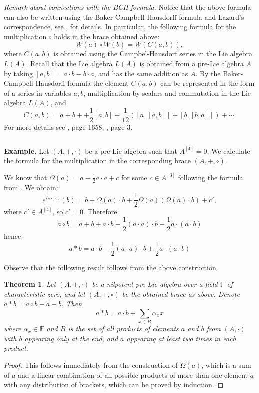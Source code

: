 \documentclass[12pt]{article}
\newtheorem{theorem}{Theorem}
\begin{document}
$ $

{\em Remark about connections with the BCH formula. } Notice that the above formula can also be written using the Baker-Campbell-Hausdorff formula and  Lazard's correspondence, see \cite{AG}, \cite{M} for details.
  In particular, the following formula for the multiplication $\circ $ holds in the brace obtained above:
\[ W(a)\circ W(b)= W(C(a, b)),\]
 where $C(a, b)$ is obtained using the Campbel-Hausdorf series in the Lie algebra $L(A)$.  Recall that the Lie algebra $L(A)$ is obtained from a pre-Lie algebra $A$ by taking $[a,b]=a\cdot b-b\cdot a$, and has the same addition as  $A$.
 By the Baker-Campbell-Hausdorff formula the element $C(a, b)$ can be represented in the form of a series in variables $a, b$, multiplication by scalars and commutation in the Lie algebra $L(A)$, and 
\[C(a,b)=a+b++{\frac 12}[a,b]+{\frac 1{12}}([a,[a,b]]+[b,[b,a]])+\cdots .\] 
 For more details see \cite {AG}, page 1658, \cite{M}, page 3.

$ $

{\bf Example.} Let $(A, +, \cdot )$ be a pre-Lie algebra such that $A^{[4]}=0$.
 We calculate the formula for the multiplication in the corresponding brace $(A, +, \circ )$.

We know that  $\Omega (a)=  a-{\frac 12}a\cdot a  +c$ for some $ c\in A^{[3]}$  following the formula from \cite{M}.
 We obtain:
\[e^{L_{\Omega (a)}}(b)=b+\Omega (a)\cdot b+{\frac 12}\Omega (a)(\Omega (a)\cdot b)+c' ,\] where $c'\in A^{[4]}$, so $c'=0$.
 Therefore
\[a\circ b=a+b+a\cdot b-{\frac 12}(a\cdot a)\cdot b+{\frac 12} a\cdot (a\cdot b) \]
hence
\[a* b=a\cdot b-{\frac 12}(a\cdot a)\cdot b+{\frac 12} a\cdot (a\cdot b) \]

 Observe that the following result follows from the above construction.
\begin{theorem}\label{1}
 Let $(A, +, \cdot )$ be a nilpotent  pre-Lie algebra over a field $\mathbb F$ of characteristic zero, and let $(A, +, \circ )$ be the obtained brace as above.  Denote $a*b=a\circ b-a-b $.
 Then \[a* b=a\cdot b +\sum _{x\in B} \alpha _{x}x\] where $\alpha _{x}\in {\mathbb F}$  and $B$ is the set of all products of elements $a$ and $b$ from $(A, \cdot )$ with $b$ appearing only at the end, and $a$ appearing at least two times in each product.
\end{theorem}
\begin{proof}
 This follows immediately from the construction of $\Omega (a)$, which is a sum of $a$ and a  linear combination of all possible products of more than one element $a$ with any distribution of brackets, which can be proved by induction.
\end{proof}
\end{document}
